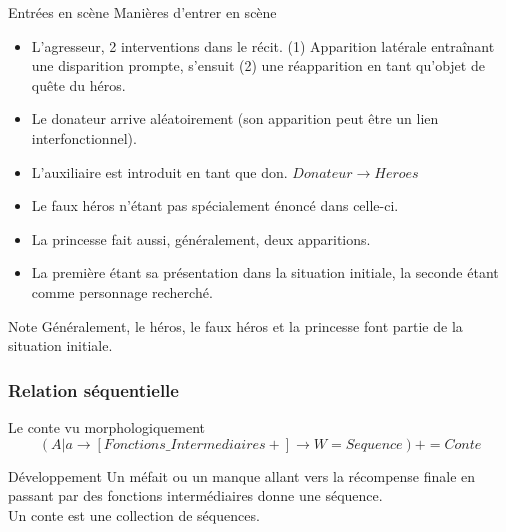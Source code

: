 \documentclass{beamer}
\begin{document}
\begin{frame}{Entrées en scène}
  Manières d'entrer en scène
  \scriptsize
  \begin{itemize}
    \item L'agresseur, 2 interventions dans le récit. (1) Apparition latérale entraînant une disparition prompte, s'ensuit (2) une réapparition en tant qu'objet de quête du héros.
    \item Le donateur arrive aléatoirement (son apparition peut être un lien interfonctionnel).
    \item L'auxiliaire est introduit en tant que don. $Donateur \rightarrow Heroes$
    \item Le faux héros n'étant pas spécialement énoncé dans celle-ci.
    \item La princesse fait aussi, généralement, deux apparitions.
    \item La première étant sa présentation dans la situation initiale, la seconde étant comme personnage recherché.
  \end{itemize}
  \normalsize
  \begin{block}{Note}
    Généralement, le héros, le faux héros et la princesse font partie de la situation initiale.
  \end{block}
\end{frame}

\subsubsection{Relation séquentielle}
\begin{frame}{Le conte vu morphologiquement}
  $$(A|a \rightarrow [Fonctions\_Intermediaires+] \rightarrow W  = Sequence)+ = Conte$$
  \begin{block}{Développement}
    Un méfait ou un manque allant vers la récompense finale en passant par des fonctions intermédiaires donne une séquence.\\ Un conte est une collection de séquences.
  \end{block}
\end{frame}
\end{document}
